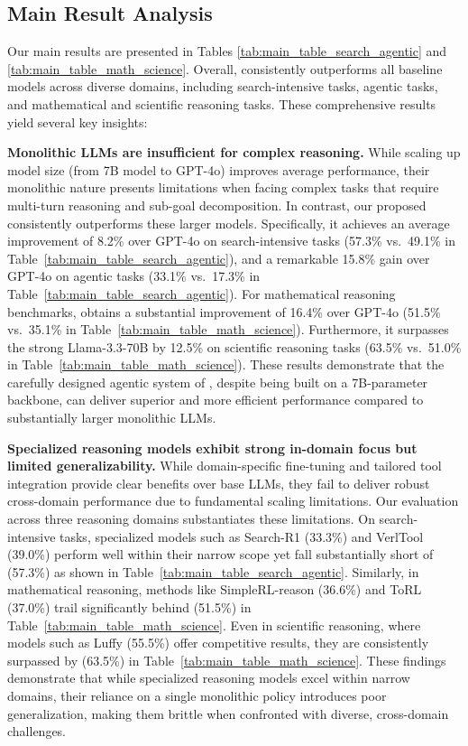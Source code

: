\subsection{Main Result Analysis}
\label{app:main_result_analysis}
Our main results are presented in Tables \ref{tab:main_table_search_agentic} and \ref{tab:main_table_math_science}. Overall, \model consistently outperforms all baseline models across diverse domains, including search-intensive tasks, agentic tasks, and mathematical and scientific reasoning tasks. These comprehensive results yield several key insights:


\textbf{Monolithic LLMs are insufficient for complex reasoning.} While scaling up model size (from 7B model to GPT-4o) improves average performance, their monolithic nature presents limitations when facing complex tasks that require multi-turn reasoning and sub-goal decomposition. In contrast, our proposed \model consistently outperforms these larger models. Specifically, it achieves an average improvement of 8.2\% over GPT-4o on search-intensive tasks (57.3\% vs.\ 49.1\% in Table~\ref{tab:main_table_search_agentic}), and a remarkable 15.8\% gain over GPT-4o on agentic tasks (33.1\% vs.\ 17.3\% in Table~\ref{tab:main_table_search_agentic}). For mathematical reasoning benchmarks, \model obtains a substantial improvement of 16.4\% over GPT-4o (51.5\% vs.\ 35.1\% in Table~\ref{tab:main_table_math_science}). Furthermore, it surpasses the strong Llama-3.3-70B by 12.5\% on scientific reasoning tasks (63.5\% vs.\ 51.0\% in Table~\ref{tab:main_table_math_science}). These results demonstrate that the carefully designed agentic system of \model, despite being built on a 7B-parameter backbone, can deliver superior and more efficient performance compared to substantially larger monolithic LLMs.  



\textbf{Specialized reasoning models exhibit strong in-domain focus but limited generalizability.}  
While domain-specific fine-tuning and tailored tool integration provide clear benefits over base LLMs, they fail to deliver robust cross-domain performance due to fundamental scaling limitations. Our evaluation across three reasoning domains substantiates these limitations. On search-intensive tasks, specialized models such as Search-R1 (33.3\%) and VerlTool (39.0\%) perform well within their narrow scope yet fall substantially short of \model (57.3\%) as shown in Table~\ref{tab:main_table_search_agentic}. Similarly, in mathematical reasoning, methods like SimpleRL-reason (36.6\%) and ToRL (37.0\%) trail significantly behind \model (51.5\%) in Table~\ref{tab:main_table_math_science}. Even in scientific reasoning, where models such as Luffy (55.5\%) offer competitive results, they are consistently surpassed by \model (63.5\%) in Table~\ref{tab:main_table_math_science}. These findings demonstrate that while specialized reasoning models excel within narrow domains, their reliance on a single monolithic policy introduces poor generalization, making them brittle when confronted with diverse, cross-domain challenges.

